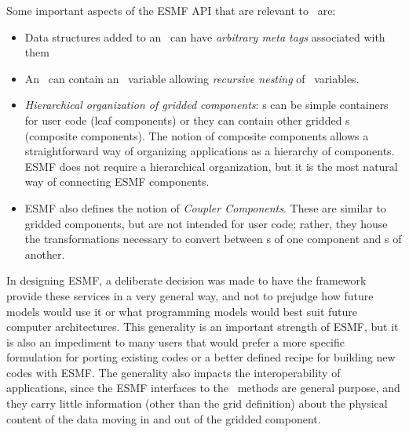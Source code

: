 Some important aspects of the ESMF API that are relevant to
\ggn\ are:
%
\begin{itemize}
\item Data structures added to an \stt\ can have \emph{arbitrary meta tags}
  associated with them
\item An \stt\ can contain an \stt\ variable allowing \emph{recursive nesting}
  of \stt\ variables.
\item \emph{Hierarchical organization of gridded components}: \egc s can be
simple containers for user code (leaf components) or they can contain other
gridded \egc s (composite components). The notion of composite components
allows a straightforward way of organizing applications as a hierarchy of
components. ESMF does not require a hierarchical organization, but it is
the most natural way of connecting ESMF components.
\item ESMF also defines the notion of \emph{Coupler Components}.
These are similar to gridded components, but are not intended for user code;
rather, they house the transformations necessary to convert between \ex s
of one component and \im s of another.
\end{itemize}

In designing ESMF, a deliberate decision was made to have the
framework provide these services in a very general way, and not to
prejudge how future models would use it or what programming models
would best suit future computer architectures. This generality is an
important strength of ESMF, but it is also an impediment to many users
that would prefer a more specific formulation for porting existing
codes or a better defined recipe for building new codes with ESMF. The
generality also impacts the interoperability of applications, since
the ESMF interfaces to the \IRF\ methods are general purpose, and they
carry little information (other than the grid definition) about the
physical content of the data moving in and out of the gridded
component.

